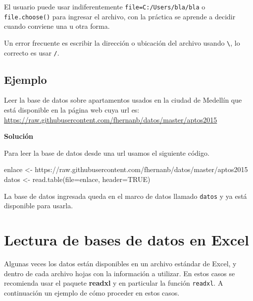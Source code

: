 \documentclass[
]{book}
\makeatletter
\newenvironment{Shaded}{\begin{snugshade}}{\end{snugshade}}
\newcommand{\AttributeTok}[1]{\textcolor[rgb]{0.77,0.63,0.00}{#1}}
\newcommand{\ConstantTok}[1]{\textcolor[rgb]{0.00,0.00,0.00}{#1}}
\newcommand{\FunctionTok}[1]{\textcolor[rgb]{0.00,0.00,0.00}{#1}}
\newcommand{\NormalTok}[1]{#1}
\newcommand{\OtherTok}[1]{\textcolor[rgb]{0.56,0.35,0.01}{#1}}
\newcommand{\StringTok}[1]{\textcolor[rgb]{0.31,0.60,0.02}{#1}}
\newenvironment{kframe}{%
\medskip{}
\setlength{\fboxsep}{.8em}
 \def\at@end@of@kframe{}%
 \ifinner\ifhmode%
  \def\at@end@of@kframe{\end{minipage}}%
  \begin{minipage}{\columnwidth}%
 \fi\fi%
 \def\FrameCommand##1{\hskip\@totalleftmargin \hskip-\fboxsep
 \colorbox{shadecolor}{##1}\hskip-\fboxsep
     \hskip-\linewidth \hskip-\@totalleftmargin \hskip\columnwidth}%
 \MakeFramed {\advance\hsize-\width
   \@totalleftmargin\z@ \linewidth\hsize
   \@setminipage}}%
 {\par\unskip\endMakeFramed%
 \at@end@of@kframe}
\renewenvironment{Shaded}{\begin{kframe}}{\end{kframe}}
\newenvironment{rmdblock}[1]
  {
  \begin{itemize}
  \renewcommand{\labelitemi}{
    \raisebox{-.7\height}[0pt][0pt]{
      {\setkeys{Gin}{width=3em,keepaspectratio}\texttt{[image: images/\#1]}}
    }
  }
  \setlength{\fboxsep}{1em}
  \begin{kframe}
  \item
  }
  {
  \end{kframe}
  \end{itemize}
  }
\newenvironment{rmdnote}
  {\begin{rmdblock}{note}}
  {\end{rmdblock}}
\newenvironment{rmdwarning}
  {\begin{rmdblock}{warning}}
  {\end{rmdblock}}
\makeatother
\begin{document}
\begin{rmdnote}
El usuario puede usar indiferentemente \texttt{file=\textquotesingle{}C:/Users/bla/bla\textquotesingle{}} o \texttt{file.choose()} para ingresar el archivo, con la práctica se aprende a decidir cuando conviene una u otra forma.
\end{rmdnote}

\begin{rmdwarning}
Un error frecuente es escribir la dirección o ubicación del archivo usando \texttt{\textbackslash{}}, lo correcto es usar \texttt{/}.
\end{rmdwarning}

\hypertarget{ejemplo-25}{%
\subsection*{Ejemplo}\label{ejemplo-25}}

Leer la base de datos sobre apartamentos usados en la ciudad de Medellín que está disponible en la página web cuya url es: \url{https://raw.githubusercontent.com/fhernanb/datos/master/aptos2015}

\textbf{Solución}

Para leer la base de datos desde una url usamos el siguiente código.

\begin{Shaded}
\begin{Highlighting}[]
\NormalTok{enlace }\OtherTok{\textless{}{-}} \StringTok{\textquotesingle{}https://raw.githubusercontent.com/fhernanb/datos/master/aptos2015\textquotesingle{}}
\NormalTok{datos }\OtherTok{\textless{}{-}} \FunctionTok{read.table}\NormalTok{(}\AttributeTok{file=}\NormalTok{enlace, }\AttributeTok{header=}\ConstantTok{TRUE}\NormalTok{)}
\end{Highlighting}
\end{Shaded}

La base de datos ingresada queda en el marco de datos llamado \texttt{datos} y ya está disponible para usarla.

\hypertarget{lectura-de-bases-de-datos-en-excel}{%
\section{Lectura de bases de datos en Excel}\label{lectura-de-bases-de-datos-en-excel}}

Algunas veces los datos están disponibles en un archivo estándar de Excel, y dentro de cada archivo hojas con la información a utilizar. En estos casos se recomienda usar el paquete \textbf{readxl} \citep{R-readxl} y en particular la función \texttt{readxl}. A continuación un ejemplo de cómo proceder en estos casos.
\end{document}
